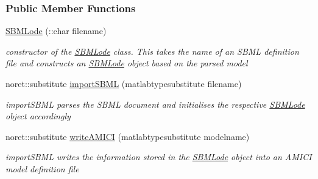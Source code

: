 \subsubsection*{Public Member Functions}
\begin{DoxyCompactItemize}
\item 
\hyperlink{class_s_b_m_lode_aafa39f9b845012c546a0e21d38a40582}{S\+B\+M\+Lode} (\+::char filename)
\begin{DoxyCompactList}\small\item\em constructor of the \hyperlink{class_s_b_m_lode}{S\+B\+M\+Lode} class. This takes the name of an S\+B\+M\+L definition file and constructs an \hyperlink{class_s_b_m_lode}{S\+B\+M\+Lode} object based on the parsed model \end{DoxyCompactList}\item 
noret\+::substitute \hyperlink{class_s_b_m_lode_a2265567db5a6aafd85729c20e9d2b631}{import\+S\+B\+M\+L} (matlabtypesubstitute filename)
\begin{DoxyCompactList}\small\item\em import\+S\+B\+M\+L parses the S\+B\+M\+L document and initialises the respective \hyperlink{class_s_b_m_lode}{S\+B\+M\+Lode} object accordingly \end{DoxyCompactList}\item 
noret\+::substitute \hyperlink{class_s_b_m_lode_af2ebf8afc99040060a0af5b3ec3632a7}{write\+A\+M\+I\+C\+I} (matlabtypesubstitute modelname)
\begin{DoxyCompactList}\small\item\em import\+S\+B\+M\+L writes the information stored in the \hyperlink{class_s_b_m_lode}{S\+B\+M\+Lode} object into an A\+M\+I\+C\+I model definition file \end{DoxyCompactList}\end{DoxyCompactItemize}
